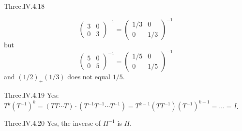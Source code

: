 \begin{ans}{Three.IV.4.18}
\begin{exparts}
\begin{equation*}
\begin{pmatrix}
              3  &0  \\
              0  &3
            \end{pmatrix}^{-1}
            =\begin{pmatrix}
              1/3  &0  \\
              0    &1/3
            \end{pmatrix}^{-1}
          \end{equation*}
          but
          \begin{equation*}
            \begin{pmatrix}
              5  &0  \\
              0  &5
            \end{pmatrix}^{-1}
            =\begin{pmatrix}
              1/5  &0  \\
              0    &1/5
            \end{pmatrix}^{-1}
          \end{equation*}
          and $(1/2)_+(1/3)$ does not equal $1/5$.
      \end{exparts}
    
\end{ans}
\begin{ans}{Three.IV.4.19}
      Yes:
      \( T^k(T^{-1})^k=(TT\cdots T)\cdot (T^{-1}T^{-1}\cdots T^{-1})
         =T^{k-1}(TT^{-1})(T^{-1})^{k-1}=\dots=I \).
    
\end{ans}
\begin{ans}{Three.IV.4.20}
       Yes, the inverse of \( H^{-1} \) is \( H \).
    
\end{ans}

